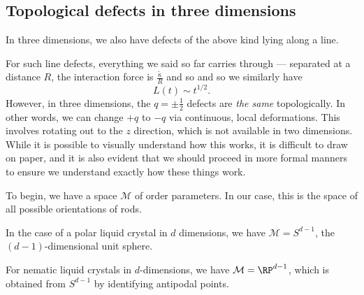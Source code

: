 \documentclass[a4paper]{article}
\begin{document}
\subsection{Topological defects in three dimensions}
In three dimensions, we also have defects of the above kind lying along a line.
\begin{center}
\end{center}
For such line defects, everything we said so far carries through --- separated at a distance $R$, the interaction force is $\frac{\tilde{\kappa}}{R}$ and so
and so we similarly have
\[
  L(t) \sim t^{1/2}.
\]
However, in three dimensions, the $q = \pm \frac{1}{2}$ defects are \emph{the same} topologically. In other words, we can change $+q$ to $-q$ via continuous, local deformations. This involves rotating out to the $z$ direction, which is not available in two dimensions. While it is possible to visually understand how this works, it is difficult to draw on paper, and it is also evident that we should proceed in more formal manners to ensure we understand exactly how these things work.

To begin, we have a space $\mathcal{M}$ of order parameters. In our case, this is the space of all possible orientations of rods.
\begin{eg}
  In the case of a polar liquid crystal in $d$ dimensions, we have $\mathcal{M} = S^{d - 1}$, the $(d - 1)$-dimensional unit sphere.
\end{eg}

\begin{eg}
  For nematic liquid crystals in $d$-dimensions, we have $\mathcal{M} = \RP^{d - 1}$, which is obtained from $S^{d - 1}$ by identifying antipodal points.
\end{eg}
\end{document}
